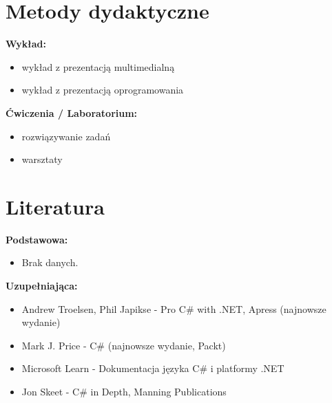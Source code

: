 \documentclass[12pt, a4paper]{article}
\begin{document}
\section{Metody dydaktyczne}

\textbf{Wykład:}
\begin{itemize}
  \item wykład z prezentacją multimedialną
  \item wykład z prezentacją oprogramowania
\end{itemize}
\vspace{4pt}
\textbf{Ćwiczenia / Laboratorium:}
\begin{itemize}
  \item rozwiązywanie zadań
  \item warsztaty
\end{itemize}
\vspace{4pt}


\section{Literatura}

\textbf{Podstawowa:}
\begin{itemize}
  \item Brak danych.
\end{itemize}

\textbf{Uzupełniająca:}
\begin{itemize}
  \item Andrew Troelsen, Phil Japikse - Pro C\# with .NET, Apress (najnowsze wydanie)
  \item Mark J. Price - C\# (najnowsze wydanie, Packt)
  \item Microsoft Learn - Dokumentacja języka C\# i platformy .NET
  \item Jon Skeet - C\# in Depth, Manning Publications
\end{itemize}
\end{document}
